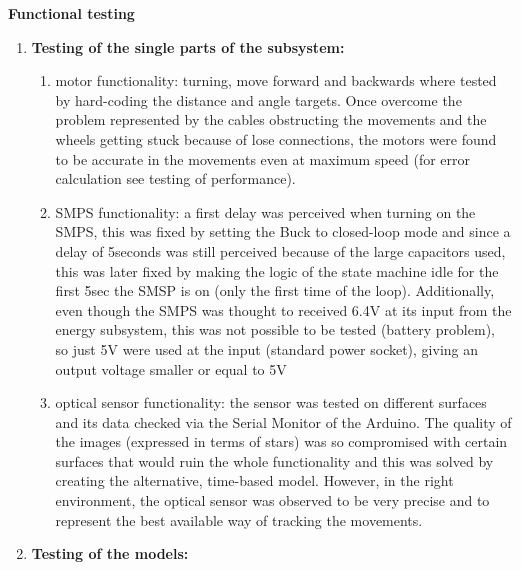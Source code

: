 \documentclass[10pt,twoside]{article}
\begin{document}
\textbf{Functional testing}
\begin{enumerate}
    \item \textbf{Testing of the single parts of the subsystem:}
    \begin{enumerate}
        \item motor functionality:  turning, move forward and backwards where tested by hard-coding the distance and angle targets. Once overcome the problem represented by the cables obstructing the movements and the wheels getting stuck because of lose connections, the motors were found to be accurate in the movements even at maximum speed (for error calculation see testing of performance).
        \item SMPS functionality: a first delay was perceived when turning on the SMPS, this was fixed by setting the Buck to closed-loop mode and since a delay of 5seconds was still perceived because of the large capacitors used, this was later fixed by making the logic of the state machine idle for the first 5sec the SMSP is on (only the first time of the loop). Additionally, even though the SMPS was thought to received 6.4V at its input from the energy subsystem, this was not possible to be tested (battery problem), so just 5V were used at the input (standard power socket), giving an output voltage smaller or equal to 5V
        \item optical sensor functionality: the sensor was tested on different surfaces and its data checked via the Serial Monitor of the Arduino. The quality of the images (expressed in terms of stars) was so compromised with certain surfaces that would ruin the whole functionality and this was solved by creating the alternative, time-based model. However, in the right environment, the optical sensor was observed to be very precise and to represent the best available way of tracking the movements.
    \end{enumerate}	
    \item \textbf{Testing of the models:}
    

\end{enumerate}
\end{document}
